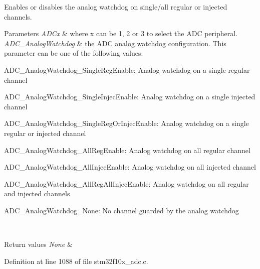 Enables or disables the analog watchdog on single/all regular or injected channels. 


\begin{DoxyParams}{Parameters}
{\em A\+D\+Cx} & where x can be 1, 2 or 3 to select the A\+DC peripheral. \\
\hline
{\em A\+D\+C\+\_\+\+Analog\+Watchdog} & the A\+DC analog watchdog configuration. This parameter can be one of the following values\+: \begin{DoxyItemize}
\item A\+D\+C\+\_\+\+Analog\+Watchdog\+\_\+\+Single\+Reg\+Enable\+: Analog watchdog on a single regular channel \item A\+D\+C\+\_\+\+Analog\+Watchdog\+\_\+\+Single\+Injec\+Enable\+: Analog watchdog on a single injected channel \item A\+D\+C\+\_\+\+Analog\+Watchdog\+\_\+\+Single\+Reg\+Or\+Injec\+Enable\+: Analog watchdog on a single regular or injected channel \item A\+D\+C\+\_\+\+Analog\+Watchdog\+\_\+\+All\+Reg\+Enable\+: Analog watchdog on all regular channel \item A\+D\+C\+\_\+\+Analog\+Watchdog\+\_\+\+All\+Injec\+Enable\+: Analog watchdog on all injected channel \item A\+D\+C\+\_\+\+Analog\+Watchdog\+\_\+\+All\+Reg\+All\+Injec\+Enable\+: Analog watchdog on all regular and injected channels \item A\+D\+C\+\_\+\+Analog\+Watchdog\+\_\+\+None\+: No channel guarded by the analog watchdog \end{DoxyItemize}
\\
\hline
\end{DoxyParams}

\begin{DoxyRetVals}{Return values}
{\em None} & \\
\hline
\end{DoxyRetVals}


Definition at line 1088 of file stm32f10x\+\_\+adc.\+c.

\mbox{\label{group___a_d_c___private___functions_ga03cef3d12292ffa2b8520524d5b0226c}} 
